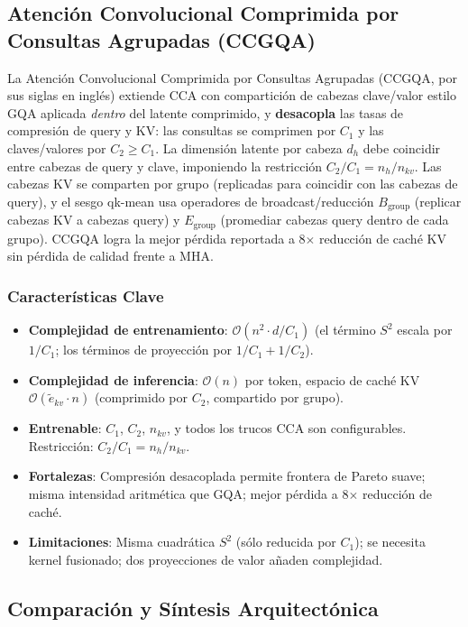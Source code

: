 \subsection{Atención Convolucional Comprimida por Consultas Agrupadas (CCGQA)}
La Atención Convolucional Comprimida por Consultas Agrupadas (CCGQA, por sus siglas en inglés) \citep{figliola_cca_2025} extiende CCA con compartición de cabezas clave/valor estilo GQA aplicada \emph{dentro} del latente comprimido, y \textbf{desacopla} las tasas de compresión de query y KV: las consultas se comprimen por $C_1$ y las claves/valores por $C_2 \geq C_1$. La dimensión latente por cabeza $d_h$ debe coincidir entre cabezas de query y clave, imponiendo la restricción $C_2 / C_1 = n_h / n_{kv}$. Las cabezas KV se comparten por grupo (replicadas para coincidir con las cabezas de query), y el sesgo qk-mean usa operadores de broadcast/reducción $B_{\text{group}}$ (replicar cabezas KV a cabezas query) y $E_{\text{group}}$ (promediar cabezas query dentro de cada grupo). CCGQA logra la mejor pérdida reportada a 8$\times$ reducción de caché KV sin pérdida de calidad frente a MHA.

\subsubsection{Características Clave}
\begin{itemize}[leftmargin=*]
    \item \textbf{Complejidad de entrenamiento}: $\mathcal{O}(n^2 \cdot d / C_1)$ (el término $S^2$ escala por $1/C_1$; los términos de proyección por $1/C_1 + 1/C_2$).
    \item \textbf{Complejidad de inferencia}: $\mathcal{O}(n)$ por token, espacio de caché KV $\mathcal{O}(\tilde{e}_{kv} \cdot n)$ (comprimido por $C_2$, compartido por grupo).
    \item \textbf{Entrenable}: $C_1$, $C_2$, $n_{kv}$, y todos los trucos CCA son configurables. Restricción: $C_2/C_1 = n_h/n_{kv}$.
    \item \textbf{Fortalezas}: Compresión desacoplada permite frontera de Pareto suave; misma intensidad aritmética que GQA; mejor pérdida a 8$\times$ reducción de caché.
    \item \textbf{Limitaciones}: Misma cuadrática $S^2$ (sólo reducida por $C_1$); se necesita kernel fusionado; dos proyecciones de valor añaden complejidad.
\end{itemize}

\subsection{Comparación y Síntesis Arquitectónica}


